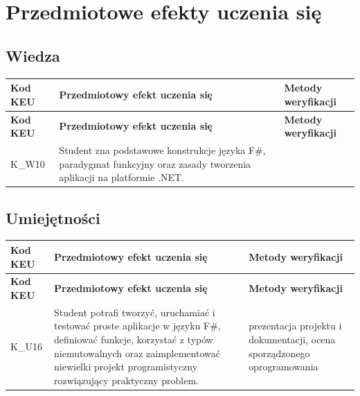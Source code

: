 \documentclass[12pt, a4paper]{article}
\newcommand{\thdrule}{\noalign{\global\setlength{\extrarowheight}{0pt}}}
\newcommand{\thdend}{\noalign{\global\setlength{\extrarowheight}{3pt}}}
\begin{document}
\section{Przedmiotowe efekty uczenia się}

\subsection*{Wiedza}
{\scriptsize
\begin{longtable}{m{1.6cm}m{9.0cm}m{4.2cm}}
\thdrule\toprule
\rowcolor{pjatkRed} {\color{white}\footnotesize\textbf{\vphantom{Ag}Kod KEU}} & {\color{white}\footnotesize\textbf{\vphantom{Ag}Przedmiotowy efekt uczenia się}} & {\color{white}\footnotesize\textbf{\vphantom{Ag}Metody weryfikacji}} \\
\midrule\thdend
\endfirsthead
\thdrule\toprule
\rowcolor{pjatkRed} {\color{white}\footnotesize\textbf{\vphantom{Ag}Kod KEU}} & {\color{white}\footnotesize\textbf{\vphantom{Ag}Przedmiotowy efekt uczenia się}} & {\color{white}\footnotesize\textbf{\vphantom{Ag}Metody weryfikacji}} \\
\midrule\thdend
\endhead
  \rowcolor{tableRowLight} K\_W10 & Student zna podstawowe konstrukcje języka F\#, paradygmat funkcyjny oraz zasady tworzenia aplikacji na platformie .NET. &  \\
\bottomrule
\end{longtable}}

\subsection*{Umiejętności}
{\scriptsize
\begin{longtable}{m{1.6cm}m{9.0cm}m{4.2cm}}
\thdrule\toprule
\rowcolor{pjatkRed} {\color{white}\footnotesize\textbf{\vphantom{Ag}Kod KEU}} & {\color{white}\footnotesize\textbf{\vphantom{Ag}Przedmiotowy efekt uczenia się}} & {\color{white}\footnotesize\textbf{\vphantom{Ag}Metody weryfikacji}} \\
\midrule\thdend
\endfirsthead
\thdrule\toprule
\rowcolor{pjatkRed} {\color{white}\footnotesize\textbf{\vphantom{Ag}Kod KEU}} & {\color{white}\footnotesize\textbf{\vphantom{Ag}Przedmiotowy efekt uczenia się}} & {\color{white}\footnotesize\textbf{\vphantom{Ag}Metody weryfikacji}} \\
\midrule\thdend
\endhead
  \rowcolor{tableRowLight} K\_U16 & Student potrafi tworzyć, uruchamiać i testować proste aplikacje w języku F\#, definiować funkcje, korzystać z typów niemutowalnych oraz zaimplementować niewielki projekt programistyczny rozwiązujący praktyczny problem. & prezentacja projektu i dokumentacji, ocena sporządzonego oprogramowania \\
\bottomrule
\end{longtable}}
\end{document}
